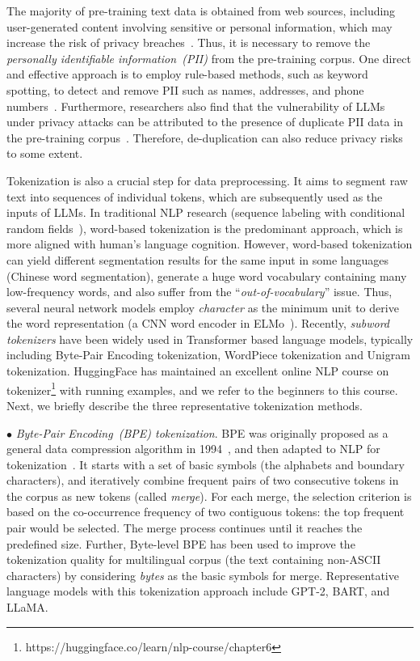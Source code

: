 The majority of pre-training text data is obtained from web sources, including user-generated content involving sensitive or personal information, which may increase the risk of privacy breaches~\cite{Carlini-USENIX-2021-Extracting}. 
Thus, it is necessary to remove the \emph{personally identifiable information~(PII)}  from the pre-training corpus. One direct and effective approach is to employ rule-based methods, such as keyword spotting, to detect and remove PII such as names, addresses, and phone numbers~\cite{Laurencon-NIPS-2022-The}. Furthermore, researchers also find that the vulnerability of LLMs under privacy attacks can be attributed to the presence of {duplicate PII data} in the pre-training corpus~\cite{Kandpal-ICML-2022-Deduplicating}. Therefore, de-duplication can also reduce privacy risks to some extent.

Tokenization is also a crucial step for data preprocessing.  
It aims to segment raw text into sequences of individual tokens, which are subsequently used as the inputs of LLMs. In traditional NLP research (\eg sequence labeling with conditional random fields~\cite{Lafferty-ICML-2001}), word-based tokenization is the predominant approach, which is more aligned with human's language cognition. However, word-based tokenization can yield different segmentation results for the same input in some languages (\eg Chinese word segmentation), generate  a huge word vocabulary containing many low-frequency words, and also suffer from the ``\emph{out-of-vocabulary}'' issue. Thus, several  neural network models employ \emph{character} as the minimum unit to derive the word representation (\eg a CNN word encoder in ELMo~\cite{Peters-NAACL-2018}). Recently, \emph{subword tokenizers} have been widely used in Transformer based language models, typically including Byte-Pair Encoding tokenization, WordPiece   tokenization and Unigram tokenization. HuggingFace has maintained an excellent online NLP course  on tokenizer\footnote{https://huggingface.co/learn/nlp-course/chapter6} with running examples, and we refer to the beginners to this course. Next, we briefly describe the three representative  tokenization methods. 

$\bullet$ \emph{Byte-Pair Encoding~(BPE) tokenization}. BPE was originally proposed as a general data compression algorithm in 1994~\cite{Philip-1994-BPE}, and then adapted to NLP for tokenization~\cite{Sennrich-ACL-2016-nueral}. It starts with a set of basic symbols (\eg the alphabets and boundary characters), and iteratively combine frequent pairs of two consecutive tokens in the corpus as new tokens (called \emph{merge}). For each merge, the selection criterion is based on the co-occurrence frequency of two   contiguous tokens: the top frequent pair would be selected. The merge process continues until it reaches the predefined size.  
Further, Byte-level BPE has been used  to improve the tokenization quality for multilingual corpus (\eg the text containing non-ASCII characters) by considering \emph{bytes} as the basic symbols for merge. %
Representative language models with this tokenization approach include GPT-2, BART, and LLaMA. 


